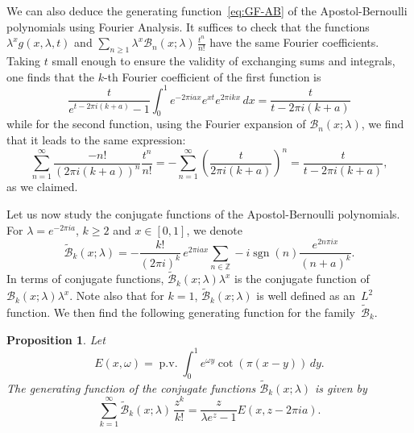 \documentclass[11pt,a4paper,reqno]{amsart}
\newcommand{\B}{\mathcal{B}}
\newcommand{\Z}{\mathbb{Z}}
\let\tilde\widetilde
\newcommand{\sgn}{\operatorname{sgn}}
\newcommand{\pv}{\operatorname{p.v.}}
\theoremstyle{plain}
\newtheorem{prop}[theorem]{Proposition}
\theoremstyle{remark}
\newtheorem{remark}{Remark}
\numberwithin{equation}{section}
\begin{document}
We can also deduce the generating function~\eqref{eq:GF-AB} of the Apostol-Bernoulli polynomials using Fourier Analysis. It suffices to check that the functions
$\lambda^x g(x,\lambda,t)$ and $\sum_{n\geq 1} \lambda^x \B_n(x;\lambda)\, \frac{t^n}{n!}$ have the same Fourier coefficients. Taking $t$ small enough to ensure the validity of exchanging sums and integrals, one finds that the $k$-th Fourier coefficient of the first function is
\begin{equation*}
  \frac{t}{e^{t-2\pi i(k+a)}-1} \int_0^1 e^{-2\pi i a x}e^{xt}e^{2\pi ikx}\,dx
  = \frac{t}{t-2\pi i(k+a)}
\end{equation*}
while for the second function, using the Fourier expansion of $\B_{n}(x;\lambda)$, we find that it leads to the same expression:
\begin{equation*}
  \sum_{n=1}^\infty \frac{-n!}{(2\pi i(k+a))^n} \frac{t^n}{n!}
  = - \sum_{n=1}^\infty \left(\frac{t}{2\pi i(k+a)}\right)^n
  = \frac{t}{t-2\pi i(k+a)},
\end{equation*}
as we claimed.

Let us now study the conjugate functions of the Apostol-Bernoulli polynomials. For
$\lambda=e^{-2\pi ia}$, $k\geq 2$ and $x\in [0,1]$, we denote
\begin{equation}
\label{eq:conjAB}
  \tilde{\B}_k(x;\lambda) = -\frac{k!}{(2\pi i)^k} \, e^{2\pi i ax} \sum_{n\in\Z} -i\sgn(n)\frac{e^{2n\pi i x}}{(n+a)^k}.
\end{equation}
%
In terms of conjugate functions, $\tilde{\B}_k(x;\lambda)\lambda^x$ is the conjugate function of $\B_k(x;\lambda)\lambda^x$. Note also that for $k = 1$,
$\tilde{\B}_k(x;\lambda)$ is well defined as an~$L^2$ function.
We then find the following generating function for the family~$\tilde{\B}_k$.


\begin{prop}
\label{prop:genconjAB}
Let
\begin{equation*}
  E(x,\omega) = \pv \int_{0}^1 e^{\omega y} \cot(\pi(x- y))\,dy.
\end{equation*}
The generating function of the conjugate functions $\tilde{\B}_k(x;\lambda)$ is given by
\begin{equation*}
  \sum_{k=1}^\infty \tilde{\B}_k(x;\lambda)\, \frac{z^k}{k!}
  = \frac{z}{\lambda e^z -1} E(x,z-2\pi ia).
\end{equation*}
\end{prop}
\end{document}
